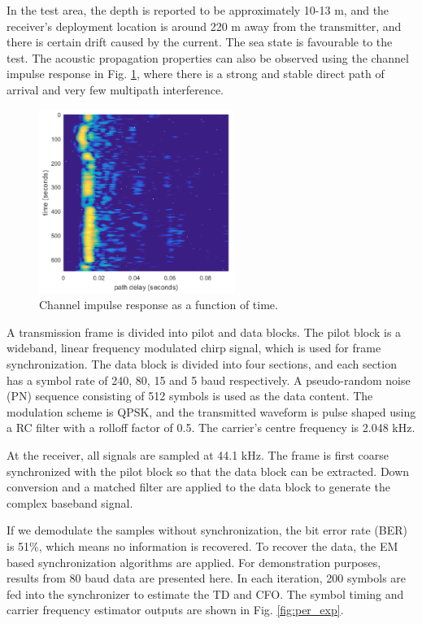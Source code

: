 \documentclass[journal,comsoc]{IEEEtran}
\begin{document}
In the test area, the depth is reported to be approximately 10-13 m, and the receiver's deployment location is around 220 m away from the transmitter, and there is certain drift caused by the current.
The sea state is favourable to the test. 
The acoustic propagation properties can also be observed using the channel impulse response in Fig. \ref{fig:chan_impu}, where there is a strong and stable direct path of arrival and very few multipath interference.
\begin{figure}[htbp]
\centering
\includegraphics[width=2.5in]{pic/channel.png}
\caption{Channel impulse response as a function of time.}
\label{fig:chan_impu} 
\end{figure}

A transmission frame is divided into pilot and data blocks. The pilot block is a wideband, linear frequency modulated chirp signal, which is used for frame synchronization.
The data block is divided into four sections, and each section has a symbol rate of 240, 80, 15 and 5 baud respectively. 
A pseudo-random noise (PN) sequence consisting of 512 symbols is used as the data content.
The modulation scheme is QPSK, and the transmitted waveform is pulse shaped using a RC filter with a rolloff factor of 0.5. 
The carrier's centre frequency is 2.048 kHz. 

At the receiver, all signals are sampled at 44.1 kHz. The frame is first coarse synchronized with the pilot block so that the data block can be extracted.
Down conversion and a matched filter are applied to the data block to generate the complex baseband signal.

If we demodulate the samples without synchronization, the bit error rate (BER) is 51\%, which means no information is recovered.
To recover the data, the EM based synchronization algorithms are applied.
For demonstration purposes, results from 80 baud data are presented here.
In each iteration, 200 symbols are fed into the synchronizer to estimate the TD and CFO. 
The symbol timing and carrier frequency estimator outputs are shown in Fig. \ref{fig:per_exp}.
\end{document}
